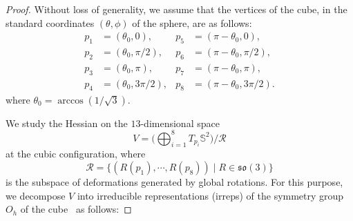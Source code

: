 \documentclass[a4paper]{amsart}
\newcommand{\uS}{\mathbb{S}}
\theoremstyle{plain} %
\theoremstyle{definition} %
\theoremstyle{remark}
\begin{document}
\begin{proof}
	Without loss of generality, we assume that the vertices of the cube, in the
	standard coordinates $(\theta, \phi)$ of the sphere, are as follows:
	\begin{align*}
		p_1 &= (\theta_0, 0),&
		p_5 &= (\pi - \theta_0, 0),\\
		p_2 &= (\theta_0, \pi/2),&
		p_6 &= (\pi - \theta_0, \pi/2),\\
		p_3 &= (\theta_0, \pi),&
		p_7 &= (\pi - \theta_0, \pi),\\
		p_4 &= (\theta_0, 3\pi/2),&
		p_8 &= (\pi - \theta_0, 3\pi/2).
	\end{align*}
	where $\theta_0 = \arccos(1/\sqrt{3})$.

	We study the Hessian on the $13$-dimensional space
	\[
		V = \Big(\bigoplus_{i=1}^8 T_{p_i} \uS^2\Big) / \mathcal{R}
	\]
	at the cubic configuration, where
	\[
		\mathcal{R} = \{(R(p_1), \cdots, R(p_8)) \mid R \in \mathfrak{so}(3)\}
	\]
	is the subspace of deformations generated by global rotations.  For this
	purpose, we decompose $V$ into irreducible representations (irreps) of the
	symmetry group $O_h$ of the cube~\cite{atkins1970} as follows:


\end{proof}
\end{document}

